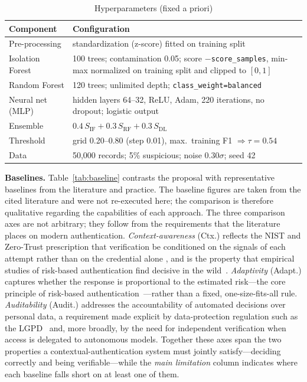 \documentclass[conference]{IEEEtran}
\begin{document}
\begin{table}[t]
\caption{Hyperparameters (fixed a priori)}
\label{tab:hyper}
\centering
\footnotesize
\setlength{\tabcolsep}{3pt}
\renewcommand{\arraystretch}{1.15}
\begin{tabular}{@{}p{1.9cm}p{6.0cm}@{}}
\toprule
\textbf{Component} & \textbf{Configuration} \\
\midrule
Pre-processing & standardization (z-score) fitted on training split \\
Isolation Forest & 100 trees; contamination 0.05; score $-$\texttt{score\_samples}, min-max normalized on training split and clipped to $[0,1]$ \\
Random Forest & 120 trees; unlimited depth; \texttt{class\_weight=balanced} \\
Neural net (MLP) & hidden layers 64--32, ReLU, Adam, 220 iterations, no dropout; logistic output \\
Ensemble & $0.4\,S_{\mathrm{IF}}+0.3\,S_{\mathrm{RF}}+0.3\,S_{\mathrm{DL}}$ \\
Threshold & grid 0.20--0.80 (step 0.01), max.\ training F1 $\Rightarrow\tau=0.54$ \\
Data & 50{,}000 records; 5\% suspicious; noise $0.30\sigma$; seed 42 \\
\bottomrule
\end{tabular}
\end{table}

\textbf{Baselines.} Table~\ref{tab:baseline} contrasts the proposal
with representative baselines from the literature and practice. The
baseline figures are taken from the cited literature and were not
re-executed here; the comparison is therefore qualitative regarding the
capabilities of each approach. The three comparison axes are not
arbitrary; they follow from the requirements that the literature places
on modern authentication. \emph{Context-awareness} (Ctx.) reflects the
NIST and Zero-Trust prescription that verification be conditioned on the
signals of each attempt rather than on the credential alone
\cite{nist80063b,rose2020}, and is the property that empirical studies
of risk-based authentication find decisive in the
wild~\cite{wiefling2019,freeman2016}. \emph{Adaptivity} (Adapt.)
captures whether the response is proportional to the estimated
risk---the core principle of risk-based
authentication~\cite{nist80063b,wiefling2019,wiefling2023}---rather than
a fixed, one-size-fits-all rule. \emph{Auditability} (Audit.) addresses
the accountability of automated decisions over personal data, a
requirement made explicit by data-protection regulation such as the
LGPD~\cite{lgpd2018} and, more broadly, by the need for independent
verification when access is delegated to autonomous models. Together
these axes span the two properties a contextual-authentication system
must jointly satisfy---deciding correctly and being verifiable---while
the \emph{main limitation} column indicates where each baseline falls
short on at least one of them.
\end{document}
